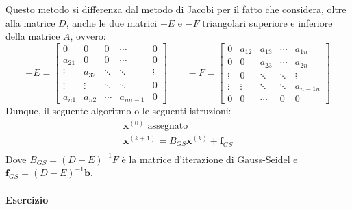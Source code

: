 Questo metodo si differenza dal metodo di Jacobi per il fatto che considera, oltre alla matrice $D$, anche le due matrici $-E$ e $-F$ triangolari superiore e inferiore della matrice $A$, ovvero:
\begin{equation*}
    -E = \begin{bmatrix}
        0 & 0 & 0 & \cdots &  0 \\
        a_{21} & 0 & 0 & \cdots & 0 \\
        \vdots & a_{32} & \ddots & \ddots & \vdots \\
        \vdots & \vdots & \ddots & \ddots & 0 \\
        a_{n1} & a_{n2} & \cdots & a_{nn-1} & 0
    \end{bmatrix}
    \hspace{2em}
    -F = \begin{bmatrix}
        0 & a_{12} & a_{13} & \cdots & a_{1n} \\
        0 & 0 & a_{23} & \cdots & a_{2n} \\
        \vdots & 0 & \ddots & \ddots & \vdots \\
        \vdots & \vdots & \ddots & \ddots & a_{n-1n} \\
        0 & 0 & \cdots & 0 & 0
    \end{bmatrix}
\end{equation*}
Dunque, il seguente algoritmo o le seguenti istruzioni:
\begin{gather*}
    \mathbf{x}^{\left(0\right)} \text{ assegnato} \\
    \mathbf{x}^{\left(k+1\right)} = B_{GS}\mathbf{x}^{\left(k\right)} + \mathbf{f}_{GS} \\
\end{gather*}
Dove $B_{GS} = \left(D-E\right)^{-1}F$ è la matrice d'iterazione di Gauss-Seidel e $\mathbf{f}_{GS} = \left(D-E\right)^{-1}\mathbf{b}$.

\paragraph{Esercizio}

